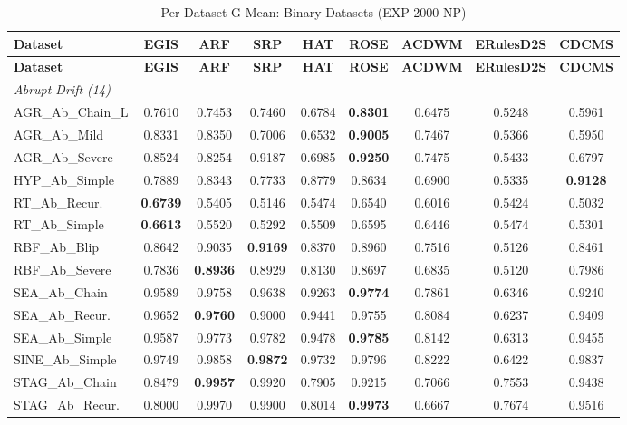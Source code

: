 \documentclass[lettersize,10pt]{article}
\begin{document}
\scriptsize
\begin{longtable}{lcccccccc}
\caption{Per-Dataset G-Mean: Binary Datasets (EXP-2000-NP)}\label{tab:s_binary_exp_2000_np} \\
\toprule
\textbf{Dataset} & \textbf{EGIS} & \textbf{ARF} & \textbf{SRP} & \textbf{HAT} & \textbf{ROSE} & \textbf{ACDWM} & \textbf{ERulesD2S} & \textbf{CDCMS} \\
\midrule
\endfirsthead
\toprule
\textbf{Dataset} & \textbf{EGIS} & \textbf{ARF} & \textbf{SRP} & \textbf{HAT} & \textbf{ROSE} & \textbf{ACDWM} & \textbf{ERulesD2S} & \textbf{CDCMS} \\
\midrule
\endhead
\midrule \multicolumn{9}{l}{\textit{Abrupt Drift (14)}}\\
\midrule
AGR\_Ab\_Chain\_L & 0.7610 & 0.7453 & 0.7460 & 0.6784 & \textbf{0.8301} & 0.6475 & 0.5248 & 0.5961 \\
AGR\_Ab\_Mild & 0.8331 & 0.8350 & 0.7006 & 0.6532 & \textbf{0.9005} & 0.7467 & 0.5366 & 0.5950 \\
AGR\_Ab\_Severe & 0.8524 & 0.8254 & 0.9187 & 0.6985 & \textbf{0.9250} & 0.7475 & 0.5433 & 0.6797 \\
HYP\_Ab\_Simple & 0.7889 & 0.8343 & 0.7733 & 0.8779 & 0.8634 & 0.6900 & 0.5335 & \textbf{0.9128} \\
RT\_Ab\_Recur. & \textbf{0.6739} & 0.5405 & 0.5146 & 0.5474 & 0.6540 & 0.6016 & 0.5424 & 0.5032 \\
RT\_Ab\_Simple & \textbf{0.6613} & 0.5520 & 0.5292 & 0.5509 & 0.6595 & 0.6446 & 0.5474 & 0.5301 \\
RBF\_Ab\_Blip & 0.8642 & 0.9035 & \textbf{0.9169} & 0.8370 & 0.8960 & 0.7516 & 0.5126 & 0.8461 \\
RBF\_Ab\_Severe & 0.7836 & \textbf{0.8936} & 0.8929 & 0.8130 & 0.8697 & 0.6835 & 0.5120 & 0.7986 \\
SEA\_Ab\_Chain & 0.9589 & 0.9758 & 0.9638 & 0.9263 & \textbf{0.9774} & 0.7861 & 0.6346 & 0.9240 \\
SEA\_Ab\_Recur. & 0.9652 & \textbf{0.9760} & 0.9000 & 0.9441 & 0.9755 & 0.8084 & 0.6237 & 0.9409 \\
SEA\_Ab\_Simple & 0.9587 & 0.9773 & 0.9782 & 0.9478 & \textbf{0.9785} & 0.8142 & 0.6313 & 0.9455 \\
SINE\_Ab\_Simple & 0.9749 & 0.9858 & \textbf{0.9872} & 0.9732 & 0.9796 & 0.8222 & 0.6422 & 0.9837 \\
STAG\_Ab\_Chain & 0.8479 & \textbf{0.9957} & 0.9920 & 0.7905 & 0.9215 & 0.7066 & 0.7553 & 0.9438 \\
STAG\_Ab\_Recur. & 0.8000 & 0.9970 & 0.9900 & 0.8014 & \textbf{0.9973} & 0.6667 & 0.7674 & 0.9516 \\

\end{longtable}
\end{document}
